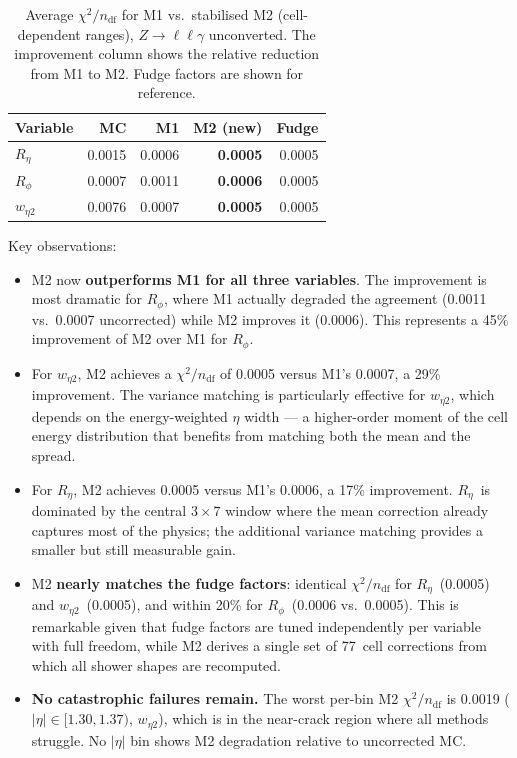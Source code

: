 \documentclass[11pt,a4paper]{article}
\newcommand{\Reta}{\ensuremath{R_{\eta}}}
\newcommand{\Rphi}{\ensuremath{R_{\phi}}}
\newcommand{\weta}{\ensuremath{w_{\eta 2}}}
\newcommand{\abseta}{\ensuremath{|\eta|}}
\newcommand{\chisq}{\ensuremath{\chi^2 / n_{\mathrm{df}}}}
\begin{document}
\begin{table}[htbp]
\centering
\caption{Average $\chisq$ for M1 vs.\ stabilised M2 (cell-dependent
  ranges), $Z \to \ell\ell\gamma$ unconverted.  The improvement
  column shows the relative reduction from M1 to M2.  Fudge factors
  are shown for reference.}
\label{tab:m2-comparison}
\begin{tabular}{lrrrr}
\toprule
Variable & MC & M1 & M2 (new) & Fudge \\
\midrule
\Reta  & 0.0015 & 0.0006 & \textbf{0.0005} & 0.0005 \\
\Rphi  & 0.0007 & 0.0011 & \textbf{0.0006} & 0.0005 \\
\weta  & 0.0076 & 0.0007 & \textbf{0.0005} & 0.0005 \\
\bottomrule
\end{tabular}
\end{table}

Key observations:
\begin{itemize}
  \item M2 now \textbf{outperforms M1 for all three variables}.  The
        improvement is most dramatic for \Rphi, where M1 actually
        degraded the agreement (0.0011 vs.\ 0.0007 uncorrected) while
        M2 improves it (0.0006).  This represents a 45\% improvement
        of M2 over M1 for \Rphi.
  \item For \weta, M2 achieves a $\chisq$ of 0.0005 versus M1's 0.0007,
        a 29\% improvement.  The variance matching is particularly
        effective for \weta, which depends on the energy-weighted $\eta$
        width --- a higher-order moment of the cell energy distribution
        that benefits from matching both the mean and the spread.
  \item For \Reta, M2 achieves 0.0005 versus M1's 0.0006, a 17\%
        improvement.  \Reta\ is dominated by the central $3 \times 7$
        window where the mean correction already captures most of the
        physics; the additional variance matching provides a smaller
        but still measurable gain.
  \item M2 \textbf{nearly matches the fudge factors}: identical $\chisq$
        for \Reta\ (0.0005) and \weta\ (0.0005), and within 20\% for
        \Rphi\ (0.0006 vs.\ 0.0005).  This is remarkable given that fudge
        factors are tuned independently per variable with full freedom,
        while M2 derives a single set of 77~cell corrections from which
        all shower shapes are recomputed.
  \item \textbf{No catastrophic failures remain.}  The worst per-bin
        M2 $\chisq$ is 0.0019 ($\abseta \in [1.30, 1.37)$, \weta),
        which is in the near-crack region where all methods struggle.
        No $\abseta$ bin shows M2 degradation relative to uncorrected MC.
\end{itemize}
\end{document}
